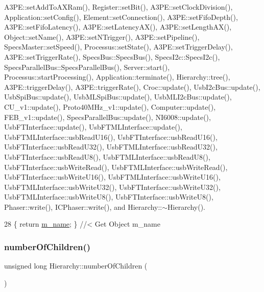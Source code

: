 A3\+P\+E\+::set\+Add\+To\+A\+X\+Ram(), Register\+::set\+Bit(), A3\+P\+E\+::set\+Clock\+Division(), Application\+::set\+Config(), Element\+::set\+Connection(), A3\+P\+E\+::set\+Fifo\+Depth(), A3\+P\+E\+::set\+Fifo\+Latency(), A3\+P\+E\+::set\+Latency\+A\+X(), A3\+P\+E\+::set\+Length\+A\+X(), Object\+::set\+Name(), A3\+P\+E\+::set\+N\+Trigger(), A3\+P\+E\+::set\+Pipeline(), Specs\+Master\+::set\+Speed(), Processus\+::set\+State(), A3\+P\+E\+::set\+Trigger\+Delay(), A3\+P\+E\+::set\+Trigger\+Rate(), Specs\+Bus\+::\+Specs\+Bus(), Specs\+I2c\+::\+Specs\+I2c(), Specs\+Parallel\+Bus\+::\+Specs\+Parallel\+Bus(), Server\+::start(), Processus\+::start\+Processing(), Application\+::terminate(), Hierarchy\+::tree(), A3\+P\+E\+::trigger\+Delay(), A3\+P\+E\+::trigger\+Rate(), Croc\+::update(), Usb\+I2c\+Bus\+::update(), Usb\+Spi\+Bus\+::update(), Usb\+M\+L\+Spi\+Bus\+::update(), Usb\+M\+L\+I2c\+Bus\+::update(), C\+U\+\_\+v1\+::update(), Proto40\+M\+Hz\+\_\+v1\+::update(), Computer\+::update(), F\+E\+B\+\_\+v1\+::update(), Specs\+Parallel\+Bus\+::update(), N\+I6008\+::update(), Usb\+F\+T\+Interface\+::update(), Usb\+F\+T\+M\+L\+Interface\+::update(), Usb\+F\+T\+M\+L\+Interface\+::usb\+Read\+U16(), Usb\+F\+T\+Interface\+::usb\+Read\+U16(), Usb\+F\+T\+Interface\+::usb\+Read\+U32(), Usb\+F\+T\+M\+L\+Interface\+::usb\+Read\+U32(), Usb\+F\+T\+Interface\+::usb\+Read\+U8(), Usb\+F\+T\+M\+L\+Interface\+::usb\+Read\+U8(), Usb\+F\+T\+Interface\+::usb\+Write\+Read(), Usb\+F\+T\+M\+L\+Interface\+::usb\+Write\+Read(), Usb\+F\+T\+Interface\+::usb\+Write\+U16(), Usb\+F\+T\+M\+L\+Interface\+::usb\+Write\+U16(), Usb\+F\+T\+M\+L\+Interface\+::usb\+Write\+U32(), Usb\+F\+T\+Interface\+::usb\+Write\+U32(), Usb\+F\+T\+M\+L\+Interface\+::usb\+Write\+U8(), Usb\+F\+T\+Interface\+::usb\+Write\+U8(), Phaser\+::write(), I\+C\+Phaser\+::write(), and Hierarchy\+::$\sim$\+Hierarchy().


\begin{DoxyCode}
28 \{ \textcolor{keywordflow}{return} \hyperlink{classObject_a8b83c95c705d2c3ba0d081fe1710f48d}{m\_name}; \} \textcolor{comment}{//< Get Object m\_name}
\end{DoxyCode}
\mbox{\label{classHierarchy_ab16e84de65fd84e14001a6cf941c8be4}} 
\subsubsection{\texorpdfstring{number\+Of\+Children()}{numberOfChildren()}}
{\footnotesize\ttfamily unsigned long Hierarchy\+::number\+Of\+Children (\begin{DoxyParamCaption}{ }\end{DoxyParamCaption})\hspace{0.3cm}{\ttfamily [inherited]}}




